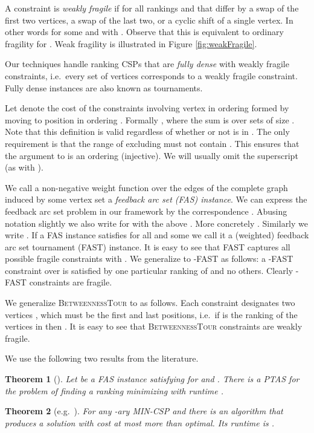 \documentclass[dvips,11pt,letter]{article}
\newtheorem{theorem}{Theorem} \newtheorem{conjecture}[theorem]{Conjecture}
\newcommand{\betTour}{\textsc{BetweennessTour}}
\newcommand{\fast}{\textsc{FAST}}
\begin{document}
{A constraint  is \emph{weakly fragile} if  for all rankings  and  that differ by a swap of the first two vertices, a swap of the last two, or a cyclic shift of a single vertex. In other words  for some  and  with . Observe that this is equivalent to ordinary fragility for . Weak fragility is illustrated in Figure \ref{fig:weakFragile}.

Our techniques handle ranking CSPs that are \emph{fully dense} with weakly fragile constraints, i.e.\ every set  of  vertices corresponds to a weakly fragile constraint. Fully dense instances are also known as tournaments.

Let  denote the cost of the constraints involving vertex  in ordering  formed by moving  to position  in ordering . Formally , where the sum is over sets  of size . Note that this definition is valid regardless of whether or not  is in . The only requirement is that the range of  excluding  must not contain . This ensures that the argument to  is an ordering (injective). We will usually omit the superscript  (as with ).

We call a non-negative weight function  over the edges of the complete graph induced by some vertex set  a \emph{feedback arc set (FAS) instance}. We can express the feedback arc set problem in our framework by the correspondence .
Abusing notation slightly we also write  for  with the above .
More concretely .
Similarly we write .
If a FAS instance satisfies  for all  and some  we call it a (weighted) feedback arc set tournament (\fast{}) instance.
It is easy to see that \fast{} captures all possible fragile constraints with .
We generalize to -FAST as follows: a -FAST constraint over  is satisfied by one particular ranking of  and no others. Clearly -FAST constraints are fragile.

We generalize \betTour{} to  as follows. Each constraint  designates two vertices , which must be the first and last positions, i.e.\ if  is the ranking of the vertices in  then . It is easy to see that \betTour{} constraints are weakly fragile.

We use the following two results from the literature.

\begin{theorem}[\cite{mathieu09fast}] \label{thm:fastPTAS}
Let  be a FAS instance satisfying  for  and . 
There is a PTAS for the problem of finding a ranking  minimizing  with runtime .
\end{theorem}

\begin{theorem}[e.g.\ \cite{AKK95,MS08}] \label{thm:addApproxCSP}
For any -ary MIN-CSP and  there is an algorithm that produces a solution with cost at most  more than optimal. Its runtime is .
\end{theorem}

}
\end{document}
